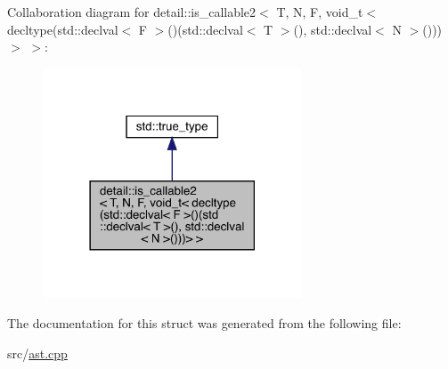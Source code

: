 Collaboration diagram for detail\+:\+:is\+\_\+callable2$<$ T, N, F, void\+\_\+t$<$ decltype(std\+:\+:declval$<$ F $>$()(std\+:\+:declval$<$ T $>$(), std\+:\+:declval$<$ N $>$()))$>$ $>$\+:
\nopagebreak
\begin{figure}[H]
\begin{center}
\leavevmode
\includegraphics[width=218pt]{structdetail_1_1is__callable2_3_01_t_00_01_n_00_01_f_00_01void__t_3_01decltype_07std_1_1declval_40d94e49e92f72cdf10f4b851b3c4af9}
\end{center}
\end{figure}


The documentation for this struct was generated from the following file\+:\begin{DoxyCompactItemize}
\item 
src/\hyperlink{ast_8cpp}{ast.\+cpp}\end{DoxyCompactItemize}
